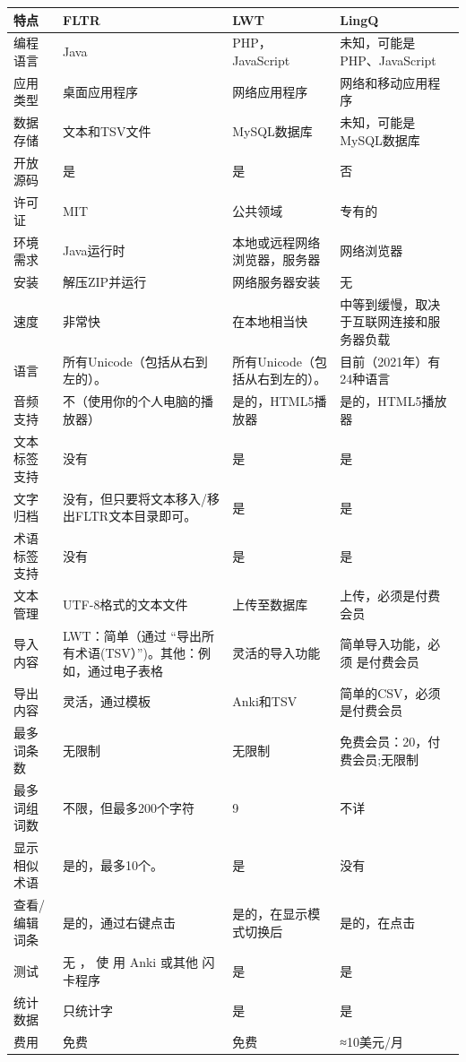 \documentclass[cn,10pt,math=newtx,citestyle=gb7714-2015,bibstyle=gb7714-2015]{elegantbook}
\begin{document}
\begin{table}[htbp]
\centering
\begin{tabularx}{\textwidth}{|X|X|X|X|}
\hline
特点 &FLTR & LWT& LingQ\\\hline
编程语言 &Java &PHP， JavaScript &未知，可能是PHP、JavaScript\\ \hline
应用类型& 桌面应用程序 &网络应用程序 &网络和移动应用程序\\\hline
数据存储& 文本和TSV文件& MySQL数据库& 未知，可能是MySQL数据库\\ \hline
开放源码& 是 &是 &否\\ \hline
许可证&MIT &公共领域 &专有的\\ \hline
环境需求& Java运行时& 本地或远程网络浏览器，服务器&网络浏览器\\ \hline
安装& 解压ZIP并运行 &网络服务器安装& 无\\ \hline
速度& 非常快& 在本地相当快& 中等到缓慢，取决于互联网连接和服务器负载\\ \hline
语言& 所有Unicode（包括从右到左的）。& 所有Unicode（包括从右到左的）。& 目前（2021年）有 24种语言\\ \hline
音频支持& 不（使用你的个人电脑的播放器）&是的，HTML5播放器& 是的，HTML5播放器\\ \hline
文本标签支持& 没有& 是& 是\\ \hline
文字归档& 没有，但只要将文本移入/移出FLTR文本目录即可。& 是& 是\\ \hline
术语标签支持 &没有 &是 &是\\ \hline
文本管理& UTF-8格式的文本文件& 上传至数据库& 上传，必须是付费会员\\ \hline
导入内容& LWT：简单（通过 “导出所有术语(TSV）”)。其他：例如，通过电子表格&灵活的导入功能&
 简单导入功能，必须 是付费会员\\ \hline
导出内容& 灵活，通过模板&Anki和TSV& 简单的CSV，必须是付费会员\\ \hline
最多词条数 & 无限制& 无限制& 免费会员：20，付费会员;无限制\\ \hline
最多词组词数& 不限，但最多200个字符 &  9 & 不详\\ \hline
显示相似术语 &  是的，最多10个。& 是& 没有\\ \hline
查看/编辑词条 &  是的，通过右键点击 & 是的，在显示模式切换后 &  是的，在点击\\ \hline
测试 &  无 ， 使 用 Anki 或其他 闪 卡程序&  是 &  是\\ \hline
统计数据 & 只统计字 & 是 &  是\\ \hline
费用 & 免费 &  免费 & ≈10美元/月\\\hline
\end{tabularx}
\end{table}
\end{document}
